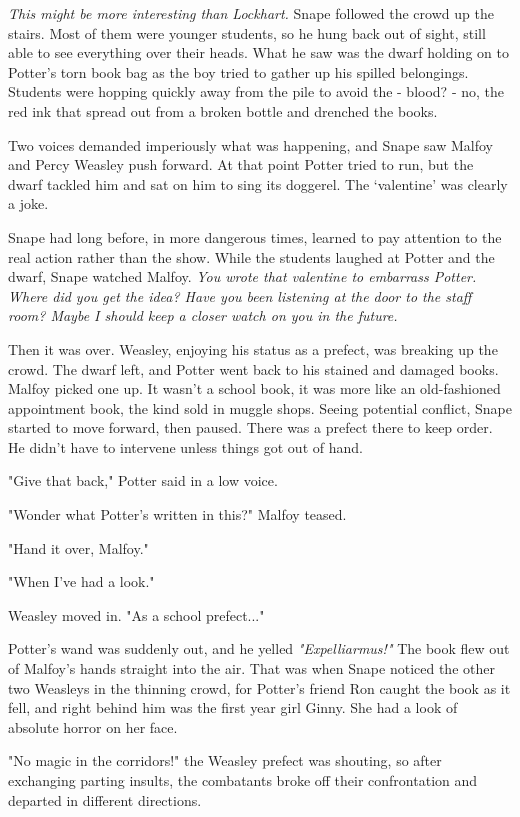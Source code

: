 \documentclass[a4paper,11pt]{article}
\begin{document}
\emph{This might be more interesting than Lockhart.} Snape followed the crowd up the stairs. Most of them were younger students, so he hung back out of sight, still able to see everything over their heads. What he saw was the dwarf holding on to Potter's torn book bag as the boy tried to gather up his spilled belongings. Students were hopping quickly away from the pile to avoid the - blood? - no, the red ink that spread out from a broken bottle and drenched the books.

Two voices demanded imperiously what was happening, and Snape saw Malfoy and Percy Weasley push forward. At that point Potter tried to run, but the dwarf tackled him and sat on him to sing its doggerel. The `valentine' was clearly a joke.

Snape had long before, in more dangerous times, learned to pay attention to the real action rather than the show. While the students laughed at Potter and the dwarf, Snape watched Malfoy. \emph{You wrote that valentine to embarrass Potter. Where did you get the idea? Have you been listening at the door to the staff room? Maybe I should keep a closer watch on you in the future.}

Then it was over. Weasley, enjoying his status as a prefect, was breaking up the crowd. The dwarf left, and Potter went back to his stained and damaged books. Malfoy picked one up. It wasn't a school book, it was more like an old-fashioned appointment book, the kind sold in muggle shops. Seeing potential conflict, Snape started to move forward, then paused. There was a prefect there to keep order. He didn't have to intervene unless things got out of hand.

"Give that back," Potter said in a low voice.

"Wonder what Potter's written in this?" Malfoy teased.

"Hand it over, Malfoy."

"When I've had a look."

Weasley moved in. "As a school prefect..."

Potter's wand was suddenly out, and he yelled \emph{"Expelliarmus!"} The book flew out of Malfoy's hands straight into the air. That was when Snape noticed the other two Weasleys in the thinning crowd, for Potter's friend Ron caught the book as it fell, and right behind him was the first year girl Ginny. She had a look of absolute horror on her face.

"No magic in the corridors!" the Weasley prefect was shouting, so after exchanging parting insults, the combatants broke off their confrontation and departed in different directions.
\end{document}
